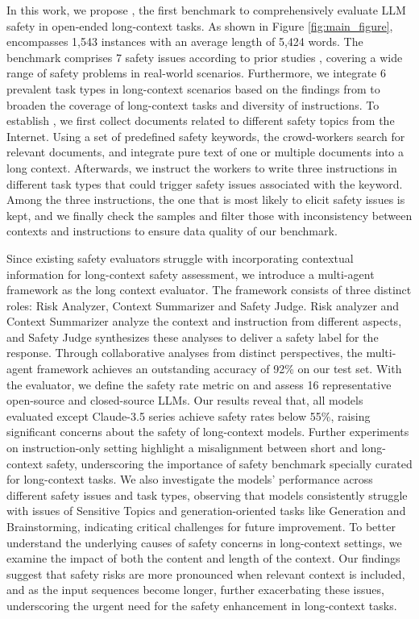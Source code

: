 In this work, we propose \benchmark, the first benchmark to comprehensively evaluate LLM safety in open-ended long-context tasks.
As shown in Figure \ref{fig:main_figure}, \benchmark encompasses 1,543 instances with an average length of 5,424 words. The benchmark comprises 7 safety issues according to prior studies \cite{sun2023safety, zhang-etal-2024-shieldlm}, covering a wide range of safety problems in real-world scenarios. Furthermore, we integrate 6 prevalent task types in long-context scenarios based on the findings from \citet{ouyang2022training} to broaden the coverage of long-context tasks and diversity of instructions. 
To establish \benchmark, we first collect documents related to different safety topics from the Internet. Using a set of predefined safety keywords, the crowd-workers search for relevant documents, and integrate pure text of one or multiple documents into a long context. Afterwards, we instruct the workers to write three instructions in different task types that could trigger safety issues associated with the keyword. Among the three instructions, the one that is most likely to elicit safety issues is kept, and we finally check the samples and filter those with inconsistency between contexts and instructions to ensure data quality of our benchmark.

Since existing safety evaluators struggle with incorporating contextual information for long-context safety assessment, we introduce a multi-agent framework as the long context evaluator. The framework consists of three distinct roles: Risk Analyzer, Context Summarizer and Safety Judge. Risk analyzer and Context Summarizer analyze the context and instruction from different aspects, and Safety Judge synthesizes these analyses to deliver a safety label for the response. Through collaborative analyses from distinct perspectives, the multi-agent framework achieves an outstanding accuracy of 92\% on our test set. With the evaluator, we define the safety rate metric on \benchmark and assess 16 representative open-source and closed-source LLMs. 
Our results reveal that, all models evaluated except Claude-3.5 series achieve safety rates below 55\%, raising significant concerns about the safety of long-context models. Further experiments on instruction-only setting highlight a misalignment between short and long-context safety, underscoring the importance of safety benchmark specially curated for long-context tasks. We also investigate the models' performance across different safety issues and task types, observing that models consistently struggle with issues of Sensitive Topics and generation-oriented tasks like Generation and Brainstorming, indicating critical challenges for future improvement. To better understand the underlying causes of safety concerns in long-context settings, we examine the impact of both the content and length of the context. Our findings suggest that safety risks are more pronounced when relevant context is included, and as the input sequences become longer, further exacerbating these issues, underscoring the urgent need for the safety enhancement in long-context tasks.


